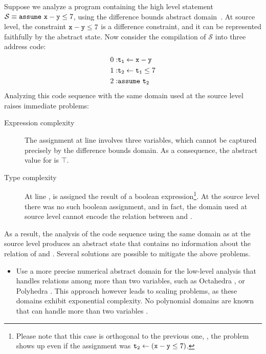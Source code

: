\documentclass{llncs}
\begin{document}
\begin{example}
\label{ex:intro}
Suppose we analyze a program containing the high level statement
$\mathcal{S} \equiv \mathtt{assume}~ \mathtt{x} - \mathtt{y} \leq 7$, using the
difference bounds abstract domain~\cite{Mine01-1}.  At source level,
the constraint $\mathtt{x} - \mathtt{y} \leq 7$ is a difference
constraint, and it can be represented faithfully by the abstract
state.  Now consider the compilation of $\mathcal{S}$ into three
address code:
\[
\begin{split}
0: & \mathtt{t_1} \leftarrow \mathtt{x} - \mathtt{y} \\
1: & \mathtt{t_2} \leftarrow \mathtt{t_1} \leq 7 \\
2: & \mathtt{assume}~ \mathtt{t_2}
\end{split}
\]   
Analyzing this code sequence with the same domain used at the source
level raises immediate problems:
\begin{description}
\item[Expression complexity]
The assignment at line  involves three variables, which
cannot be captured precisely by the difference bounds domain. As a
consequence, the abstract value for  is $\top$.

\item[Type complexity] At line ,  is assigned the
result of a boolean expression\footnote{Please note that this case is
orthogonal to the previous one, \ie, the problem shows up even if the
assignment was $ \mathtt{t_2} \leftarrow (\mathtt{x} - \mathtt{y} \leq 7)$.}.
At the source level there was no such boolean assignment, and in fact,
the domain used at source level cannot encode the relation between
 and .
\end{description}
As a result, the analysis of the code sequence using the same domain
as at the source level produces an abstract state that contains no
information about the relation of  and .
Several solutions are possible to mitigate the above problems.
\begin{itemize}
\item Use a more precise numerical abstract domain for the low-level
analysis that handles relations among more than two variables, such
as Octahedra \cite{ClarisoCortadella04}, or Polyhedra
\cite{CousotHalbwachs78,PPL}. This approach however leads to
scaling problems, as these domains exhibit exponential complexity. No
polynomial domains are known that can handle more than two variables \cite{Mine04}.


\end{itemize}
\end{example}
\end{document}
